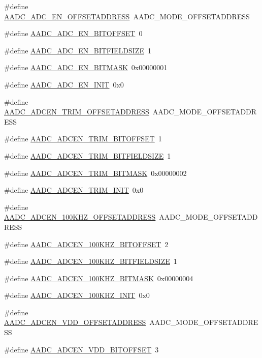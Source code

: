 \begin{DoxyCompactItemize}
\#define \hyperlink{a00543_ad5c4d3dd96e6757b15e2e93b7a48f7d6}{AADC\_\-ADC\_\-EN\_\-OFFSETADDRESS}~AADC\_\-MODE\_\-OFFSETADDRESS
\item 
\#define \hyperlink{a00543_a87a641b412397281069cbf83a83a0d94}{AADC\_\-ADC\_\-EN\_\-BITOFFSET}~0
\item 
\#define \hyperlink{a00543_ab9b0b1d15bdd9b845c4466e7d09a2f94}{AADC\_\-ADC\_\-EN\_\-BITFIELDSIZE}~1
\item 
\#define \hyperlink{a00543_a927bc8be5002ab2c2e36aa76b4c6ff39}{AADC\_\-ADC\_\-EN\_\-BITMASK}~0x00000001
\item 
\#define \hyperlink{a00543_a2ae1db5f1afec9ae3aac6a64c0864834}{AADC\_\-ADC\_\-EN\_\-INIT}~0x0
\item 
\#define \hyperlink{a00543_af03eddca2398e119c5ee8c91b092b983}{AADC\_\-ADCEN\_\-TRIM\_\-OFFSETADDRESS}~AADC\_\-MODE\_\-OFFSETADDRESS
\item 
\#define \hyperlink{a00543_acfbdb30fab0f0774b4796b54d8c68a5c}{AADC\_\-ADCEN\_\-TRIM\_\-BITOFFSET}~1
\item 
\#define \hyperlink{a00543_aeafcb84018c29448fe257be31cfd0894}{AADC\_\-ADCEN\_\-TRIM\_\-BITFIELDSIZE}~1
\item 
\#define \hyperlink{a00543_a321534e74cb2c4ef223ed15b8d4c147a}{AADC\_\-ADCEN\_\-TRIM\_\-BITMASK}~0x00000002
\item 
\#define \hyperlink{a00543_a7718b06481873c289ff33bf4b1d7ddf6}{AADC\_\-ADCEN\_\-TRIM\_\-INIT}~0x0
\item 
\#define \hyperlink{a00543_ad12fc16b532b2f78e1d7f8f08ae44de2}{AADC\_\-ADCEN\_\-100KHZ\_\-OFFSETADDRESS}~AADC\_\-MODE\_\-OFFSETADDRESS
\item 
\#define \hyperlink{a00543_ac8a51491ebe672cbd2c52a97c71b05e6}{AADC\_\-ADCEN\_\-100KHZ\_\-BITOFFSET}~2
\item 
\#define \hyperlink{a00543_acccacd2d97dcf55aebba36a09bf3fe1f}{AADC\_\-ADCEN\_\-100KHZ\_\-BITFIELDSIZE}~1
\item 
\#define \hyperlink{a00543_a6c48bdf57fed6d89bd387f4a1c3a87aa}{AADC\_\-ADCEN\_\-100KHZ\_\-BITMASK}~0x00000004
\item 
\#define \hyperlink{a00543_aa83ae996af97b7a58af75e574a21a855}{AADC\_\-ADCEN\_\-100KHZ\_\-INIT}~0x0
\item 
\#define \hyperlink{a00543_ab685795704d4e41099e04b7bda899b33}{AADC\_\-ADCEN\_\-VDD\_\-OFFSETADDRESS}~AADC\_\-MODE\_\-OFFSETADDRESS
\item 
\#define \hyperlink{a00543_a82833aaadee21f6172a0aa3f0db67a32}{AADC\_\-ADCEN\_\-VDD\_\-BITOFFSET}~3
\item 

\end{DoxyCompactItemize}
